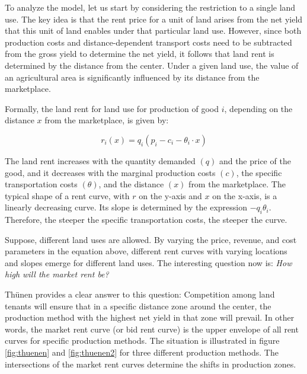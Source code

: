 \documentclass[
  12pt,
  oneside]{book}
\theoremstyle{definition}
\theoremstyle{definition}
\theoremstyle{definition}
\theoremstyle{definition}
\theoremstyle{remark}
\begin{document}
To analyze the model, let us start by considering the restriction to a single land use. The key idea is that the rent price for a unit of land arises from the net yield that this unit of land enables under that particular land use. However, since both production costs and distance-dependent transport costs need to be subtracted from the gross yield to determine the net yield, it follows that land rent is determined by the distance from the center. Under a given land use, the value of an agricultural area is significantly influenced by its distance from the marketplace.

Formally, the land rent for land use for production of good \(i\), depending on the distance \(x\) from the marketplace, is given by:

\[
r_i(x) = q_i(p_i - c_i - \theta_i \cdot x)
\]

The land rent increases with the quantity demanded \((q)\) and the price of the good, and it decreases with the marginal production costs \((c)\), the specific transportation costs \((\theta)\), and the distance \((x)\) from the marketplace. The typical shape of a rent curve, with \(r\) on the y-axis and \(x\) on the x-axis, is a linearly decreasing curve. Its slope is determined by the expression \(-q_i \theta_i\). Therefore, the steeper the specific transportation costs, the steeper the curve.

Suppose, different land uses are allowed. By varying the price, revenue, and cost parameters in the equation above, different rent curves with varying locations and slopes emerge for different land uses. The interesting question now is: \emph{How high will the market rent be?}

Thünen provides a clear answer to this question: Competition among land tenants will ensure that in a specific distance zone around the center, the production method with the highest net yield in that zone will prevail. In other words, the market rent curve (or bid rent curve) is the upper envelope of all rent curves for specific production methods. The situation is illustrated in figure \ref{fig:thuenen} and \ref{fig:thuenen2} for three different production methods. The intersections of the market rent curves determine the shifts in production zones.
\end{document}
